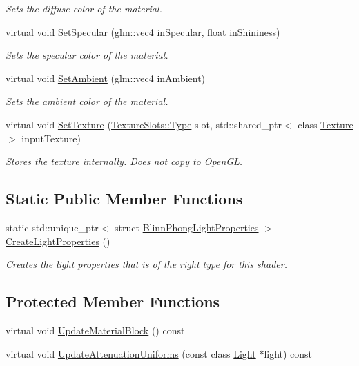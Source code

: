 \begin{DoxyCompactItemize}
\begin{DoxyCompactList}\small\item\em Sets the diffuse color of the material. \end{DoxyCompactList}\item 
virtual void \hyperlink{class_blinn_phong_shader_a6567423da36050cc1567919707e8be72}{Set\+Specular} (glm\+::vec4 in\+Specular, float in\+Shininess)
\begin{DoxyCompactList}\small\item\em Sets the specular color of the material. \end{DoxyCompactList}\item 
virtual void \hyperlink{class_blinn_phong_shader_a0f8c1c478525dd662922597ea7d9c4ac}{Set\+Ambient} (glm\+::vec4 in\+Ambient)
\begin{DoxyCompactList}\small\item\em Sets the ambient color of the material. \end{DoxyCompactList}\item 
virtual void \hyperlink{class_blinn_phong_shader_aa9c8908b300ce1451887945fb961d3b2}{Set\+Texture} (\hyperlink{struct_blinn_phong_shader_1_1_texture_slots_a98940b49ba855ee47d61a6243c05c34d}{Texture\+Slots\+::\+Type} slot, std\+::shared\+\_\+ptr$<$ class \hyperlink{class_texture}{Texture} $>$ input\+Texture)
\begin{DoxyCompactList}\small\item\em Stores the texture internally. Does not copy to Open\+G\+L. \end{DoxyCompactList}\end{DoxyCompactItemize}
\subsection*{Static Public Member Functions}
\begin{DoxyCompactItemize}
\item 
static std\+::unique\+\_\+ptr$<$ struct \hyperlink{struct_blinn_phong_light_properties}{Blinn\+Phong\+Light\+Properties} $>$ \hyperlink{class_blinn_phong_shader_a44f9413ef4896886b67b12c8809e5cd9}{Create\+Light\+Properties} ()
\begin{DoxyCompactList}\small\item\em Creates the light properties that is of the right type for this shader. \end{DoxyCompactList}\end{DoxyCompactItemize}
\subsection*{Protected Member Functions}
\begin{DoxyCompactItemize}
\item 
virtual void \hyperlink{class_blinn_phong_shader_ab620e8e40408c63f465af866e5ca9ef7}{Update\+Material\+Block} () const 
\item 
virtual void \hyperlink{class_blinn_phong_shader_aca3ae20f36d92b4e9b64ca4ae51a49f2}{Update\+Attenuation\+Uniforms} (const class \hyperlink{class_light}{Light} $\ast$light) const 
\end{DoxyCompactItemize}

